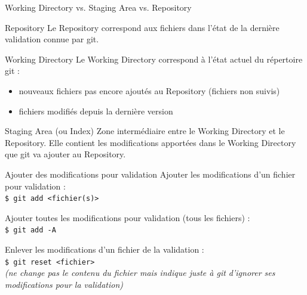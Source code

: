 \documentclass[usepdftitle=false]{beamer}
\begin{document}
\begin{frame}{Working Directory vs. Staging Area vs. Repository}
	\begin{block}{Repository}
		Le Repository correspond aux fichiers dans l'état de la dernière validation connue par git.
	\end{block}

	\begin{block}{Working Directory}
		Le Working Directory correspond à l'état actuel du répertoire git :
		\begin{itemize}
			\item nouveaux fichiers pas encore ajoutés au Repository (fichiers non suivis)
			\item fichiers modifiés depuis la dernière version
		\end{itemize}
	\end{block}

	\begin{block}{Staging Area (ou Index)}
		Zone intermédiaire entre le Working Directory et le Repository.
		Elle contient les modifications apportées dans le Working Directory que git va ajouter au Repository.
	\end{block}

\end{frame}

\begin{frame}[fragile]{Ajouter des modifications pour validation}
	Ajouter les modifications d'un fichier pour validation : \\
	\verb+$ git add <fichier(s)>+

	\medskip

	Ajouter toutes les modifications pour validation (tous les fichiers) : \\
	\verb+$ git add -A+

	\medskip

	Enlever les modifications d'un fichier de la validation : \\
	\verb+$ git reset <fichier>+ \\
	{\it (ne change pas le contenu du fichier mais indique juste à git d'ignorer ses modifications pour la validation)}

\end{frame}
\end{document}
